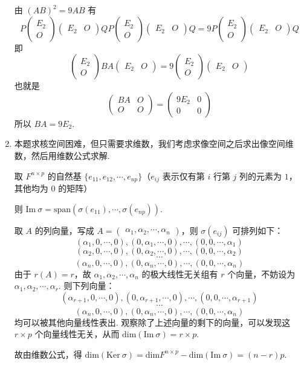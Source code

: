 \begin{enumerate}
    由 $(AB)^2=9AB$ 有 \[P\begin{pmatrix}E_2 \\ O\end{pmatrix}\begin{pmatrix}E_2 & O\end{pmatrix}QP\begin{pmatrix}E_2 \\ O\end{pmatrix}\begin{pmatrix}E_2 & O\end{pmatrix}Q=9P\begin{pmatrix}E_2 \\ O\end{pmatrix}\begin{pmatrix}E_2 & O\end{pmatrix}Q\]
    即 \[\begin{pmatrix}E_2 \\ O\end{pmatrix}BA\begin{pmatrix}E_2 & O\end{pmatrix}=9\begin{pmatrix}E_2 \\ O\end{pmatrix}\begin{pmatrix}E_2 & O\end{pmatrix}\]
    也就是 \[\begin{pmatrix}BA & O \\ O & O\end{pmatrix}=\begin{pmatrix}9E_2 & 0 \\ 0 & 0\end{pmatrix}\]
    所以 $BA=9E_2$.
    \item 本题求核空间困难，但只需要求维数，我们考虑求像空间之后求出像空间维数，然后用维数公式求解.
    
    取 $F^{n\times p}$ 的自然基 $\{e_{11},e_{12},\cdots,e_{np}\}$（$e_{ij}$ 表示仅有第 $i$ 行第 $j$ 列的元素为 $1$，其他均为 $0$ 的矩阵）

    则 $\mathrm{Im}\ \sigma=\mathrm{span}(\sigma(e_{11}),\cdots,\sigma(e_{np}))$.

    取 $A$ 的列向量，写成 $A=\begin{pmatrix}\alpha_1,\alpha_2,\cdots,\alpha_n\end{pmatrix}$，则 $\sigma(e_{ij})$ 可排列如下：
    \[(\alpha_1,0,\cdots,0),(0,\alpha_1,\cdots,0),\cdots,(0,0,\cdots,\alpha_1)\]
    \[(\alpha_2,0,\cdots,0),(0,\alpha_2,\cdots,0),\cdots,(0,0,\cdots,\alpha_2)\]
    \[\cdots\]
    \[(\alpha_n,0,\cdots,0),(0,\alpha_n,\cdots,0),\cdots,(0,0,\cdots,\alpha_n)\]
    由于 $r(A)=r$，故 $\alpha_1,\alpha_2,\cdots,\alpha_n$ 的极大线性无关组有 $r$ 个向量，不妨设为 $\alpha_1,\alpha_2,\cdots,\alpha_r$. 则下列向量：
    \[(\alpha_{r+1},0,\cdots,0),(0,\alpha_{r+1},\cdots,0),\cdots,(0,0,\cdots,\alpha_{r+1})\]
    \[\cdots\]
    \[(\alpha_n,0,\cdots,0),(0,\alpha_n,\cdots,0),\cdots,(0,0,\cdots,\alpha_n)\]
    均可以被其他向量线性表出. 观察除了上述向量的剩下的向量，可以发现这 $r\times p$ 个向量线性无关，从而 $\mathrm{dim}(\mathrm{Im}\ \sigma) = r\times p$.

    故由维数公式，得 $\mathrm{dim}(\mathrm{Ker}\ \sigma) = \mathrm{dim}F^{n\times p}-\mathrm{dim}(\mathrm{Im} \ \sigma) = (n-r)p$.
\end{enumerate}

\clearpage

